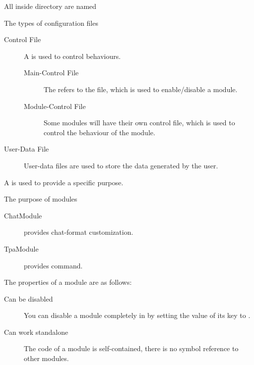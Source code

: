 \label{ch:concept}

All  inside  directory are named 

\begin{note}{The types of configuration files}
    \begin{description}
        \item[Control File] {A  is used to control behaviours.}
        \begin{description}
            \item[Main-Control File] The  refers to the  file, which is used to enable/disable a module.
            \item[Module-Control File] Some modules will have their own control file, which is used to control the behaviour of the module.
        \end{description}

        \item[User-Data File] User-data files are used to store the data generated by the user.
    \end{description}
\end{note}


\clearpage
{}

A  is used to provide a specific purpose.
\begin{example}{The purpose of modules}
    \begin{description}
        \item [ChatModule] provides chat-format customization.
        \item [TpaModule] provides  command.
    \end{description}
\end{example}

The properties of a module are as follows:
\begin{description}
    \item [Can be disabled] You can disable a module completely in  by setting the value of its  key to .
    \item [Can work standalone] The code of a module is self-contained, there is no symbol reference to other modules.
\end{description}

